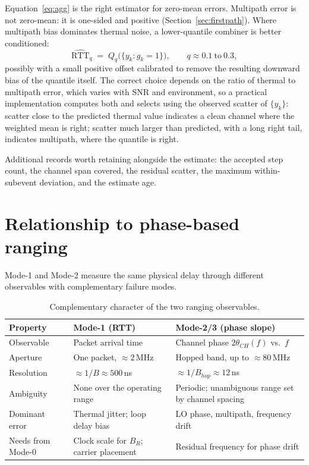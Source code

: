 \documentclass[11pt,a4paper]{article}
\newcommand{\RTT}{\mathrm{RTT}}
\begin{document}
Equation~\eqref{eq:agg} is the right estimator for zero-mean errors. Multipath error is not
zero-mean: it is one-sided and positive (Section~\ref{sec:firstpath}). Where multipath bias
dominates thermal noise, a lower-quantile combiner is better conditioned:
\begin{equation}
\widehat{\RTT}_{q} \;=\; Q_q\bigl(\{y_k : g_k = 1\}\bigr), \qquad q \approx 0.1\ \text{to}\ 0.3 ,
\label{eq:quantile}
\end{equation}
possibly with a small positive offset calibrated to remove the resulting downward bias of the
quantile itself. The correct choice depends on the ratio of thermal to multipath error, which
varies with SNR and environment, so a practical implementation computes both and selects using the
observed scatter of $\{y_k\}$: scatter close to the predicted thermal value indicates a clean
channel where the weighted mean is right; scatter much larger than predicted, with a long right
tail, indicates multipath, where the quantile is right.

Additional records worth retaining alongside the estimate: the accepted step count, the channel
span covered, the residual scatter, the maximum within-subevent deviation, and the estimate age.

\section{Relationship to phase-based ranging}
\label{sec:fusion}

Mode-1 and Mode-2 measure the same physical delay through different observables with complementary
failure modes.

\begin{table}[h]
\caption{Complementary character of the two ranging observables.}
\label{tab:fusion}
\centering\small
\begin{tabular}{@{}L{34mm}L{45mm}L{45mm}@{}}
\toprule
Property & Mode-1 (RTT) & Mode-2/3 (phase slope) \\
\midrule
Observable & Packet arrival time & Channel phase $2\theta_{CH}(f)$ vs.\ $f$ \\
Aperture & One packet, $\approx 2$\,MHz & Hopped band, up to $\approx 80$\,MHz \\
Resolution & $\approx 1/B \approx 500$\,ns & $\approx 1/B_{hop} \approx 12$\,ns \\
Ambiguity & None over the operating range & Periodic; unambiguous range set by channel spacing \\
Dominant error & Thermal jitter; loop delay bias & LO phase, multipath, frequency drift \\
Needs from Mode-0 & Clock scale for $B_R$; carrier placement & Residual frequency for phase drift \\
\bottomrule
\end{tabular}
\end{table}
\end{document}
